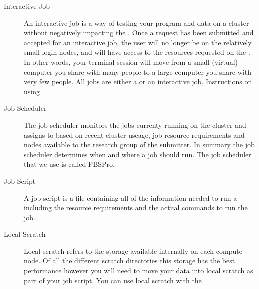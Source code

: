 \documentclass[letterpaper,10pt,english]{sphinxmanual}
\begin{document}
\begin{description}
\item[{Interactive Job\label{\detokenize{glossary:term-Interactive-Job}}}] \leavevmode
An interactive job is a way of testing your program and data on a cluster without negatively impacting the {\hyperref[\detokenize{glossary:term-Login-Node}]{}}. Once a request has been submitted and accepted for an interactive job, the user will no longer be on the relatively small login nodes, and will have access to the resources requested on the {\hyperref[\detokenize{glossary:term-Compute-Nodes}]{}}. In other words, your terminal session will move from a small (virtual) computer you share with many people to a large computer you share with very few people. All jobs are either a {\hyperref[\detokenize{glossary:term-Batch-Job}]{}} or an interactive job. Instructions on using {\hyperref[\detokenize{using_katana/running_jobs:interactive-job}]{}}

\item[{Job Scheduler\label{\detokenize{glossary:term-Job-Scheduler}}}] \leavevmode
The job scheduler monitors the jobs currenty running on the cluster and assigns {\hyperref[\detokenize{glossary:term-Queued-Jobs}]{}} to {\hyperref[\detokenize{glossary:term-Compute-Nodes}]{}} based on recent cluster useage, job resource requirements and nodes available to the research group of the submitter. In summary the job scheduler determines when and where a job should run. The job scheduler that we use is called PBSPro.

\item[{Job Script\label{\detokenize{glossary:term-Job-Script}}}] \leavevmode
A job script is a file containing all of the information needed to run a {\hyperref[\detokenize{glossary:term-Batch-Job}]{}} including the resource requirements and the actual commands to run the job.

\item[{Local Scratch\label{\detokenize{glossary:term-Local-Scratch}}}] \leavevmode
Local scratch refers to the storage available internally on each compute node. Of all the different scratch directories this storage has the best performance however you will need to move your data into local scratch as part of your job script. You can use local scratch with the {\hyperref[\detokenize{glossary:term-Environment-Variable}]{}} 


\end{description}
\end{document}
